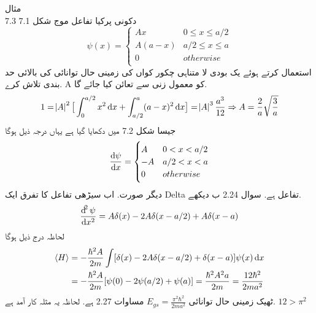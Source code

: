 \documentclass{book}
\begin{document}
مثال \\7.3
دکونی پرکیا تفاعل موج شکل 7.1
\[\psi(x)=\begin{cases}
Ax & 0\le x\le a/2\\
A(a-x) & a/2\le x\le a\\
0 & otherwise\\
\end{cases}\]
استعمال کرتے ہوئے یک بودی لا متناہی چکور كواں کی زمینی حال توانائی کی بالائی حد بندی تلاش کرے. A کو معمول زنی سے تعائن کیا جائے گا.
\[1=\abs{A}^{2}\big [\int_{0}^{a/2} x^{2}\dif{x}+\int_{a/2}^{a}(a-x)^{2}\dif{x} \big ]=\abs{A}^{3}\frac{a^{3}}{12}\Rightarrow A=\frac{2}{a}\sqrt{\frac{3}{a}}\]
جیسا شکل 7.2 میں دکھایا گیا ہے یہاں درجہ ذيل ہوگا
\[\frac{\dif{\psi}}{\dif{x}}=\begin{cases}
A & 0<x<a/2\\
-A & a/2<x<a\\
0& otherwise\\
\end{cases}\]
دیگر صورت. اب سیڑھی تفاعل کا تفرق ایک Delta تفاعل ہے. سوال 2.24 ب دیکھے.
\[\frac{\dif^{2}{\psi}}{\dif{x^{2}}}=A\delta(x)-2A\delta(x-a/2)+A\delta(x-a)\]
لحاظہ درج ذیل ہوگا 
\begin{align*}
\langle H \rangle &= -\frac{\hbar^{2}A}{2m}\int[\delta(x)-2A\delta(x-a/2)+\delta(x-a)]\psi(x)\dif{x}\\
&= -\frac{\hbar^{2}A}{2m}[\psi(0)-2\psi(a/2)+\psi(a)]=\frac{\hbar^{2}A^{2}a}{2m}=\frac{12\hbar^{2}}{2ma^{2}}\\
\end{align*}
ٹھیک زمینی حال توانائی
\(E_{gs}=\frac{\pi^{2}\hbar^{2}}{2ma^{2}}\)
مساوات 2.27 ہے. لحاظہ یہ مثلہ کار آمد ہے. 
\(12>\pi^{2}\)\\
\end{document}
